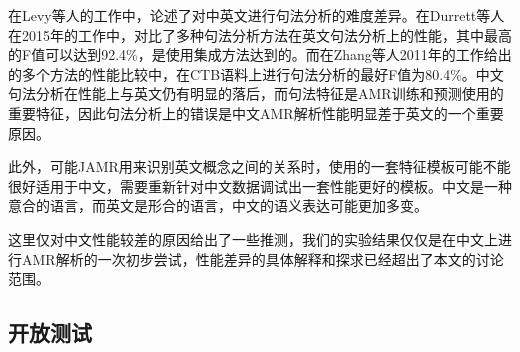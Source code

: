 \documentclass[master, winfont]{njuthesis}
\begin{document}
在Levy等人的工作\cite{Levy2003Is}中，论述了对中英文进行句法分析的难度差异。在Durrett等人在2015年的工作\cite{Durrett2015Neural}中，对比了多种句法分析方法在英文句法分析上的性能，其中最高的F值可以达到92.4\%，是使用集成方法达到的。而在Zhang等人2011年的工作\cite{Zhang2011Syntactic}给出的多个方法的性能比较中，在CTB语料上进行句法分析的最好F值为80.4\%。中文句法分析在性能上与英文仍有明显的落后，而句法特征是AMR训练和预测使用的重要特征，因此句法分析上的错误是中文AMR解析性能明显差于英文的一个重要原因。

此外，可能JAMR用来识别英文概念之间的关系时，使用的一套特征模板可能不能很好适用于中文，需要重新针对中文数据调试出一套性能更好的模板。中文是一种意合的语言，而英文是形合的语言，中文的语义表达可能更加多变。

这里仅对中文性能较差的原因给出了一些推测，我们的实验结果仅仅是在中文上进行AMR解析的一次初步尝试，性能差异的具体解释和探求已经超出了本文的讨论范围。

\subsection{开放测试}
\begin{center}
\begin{table}[!htbp]
\caption{\label{generaltest} AMR中英文开放测试性能}
\end{table}
\end{center}
\end{document}
